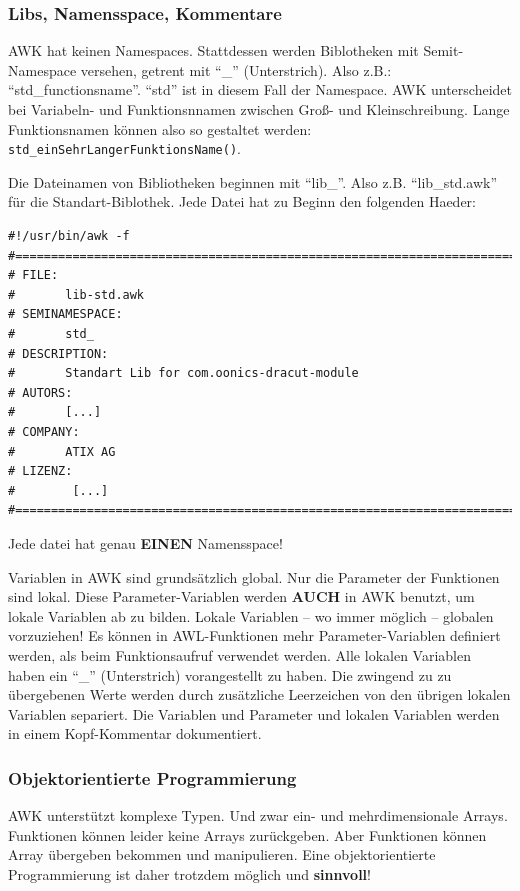 \documentclass[10pt,a4paper]{article}
\begin{document}
\subsubsection{Libs, Namensspace, Kommentare}

AWK hat keinen Namespaces. Stattdessen werden Biblotheken mit Semit-Namespace versehen, getrent mit "`\_"' (Unterstrich). Also z.B.: "`std\_functionsname"'. "`std"' ist in diesem Fall der Namespace. AWK unterscheidet bei Variabeln- und Funktionsnnamen zwischen Groß- und Kleinschreibung. Lange Funktionsnamen können also so gestaltet werden: \texttt{std\_einSehrLangerFunktionsName()}.


Die Dateinamen von Bibliotheken beginnen mit "`lib\_"'. Also z.B. "`lib\_std.awk"' für die Standart-Biblothek. Jede Datei hat zu Beginn den folgenden Haeder:

\begin{lstlisting}
#!/usr/bin/awk -f
#==============================================================================
# FILE:
#       lib-std.awk
# SEMINAMESPACE:
#       std_
# DESCRIPTION:
#       Standart Lib for com.oonics-dracut-module
# AUTORS:
#       [...]
# COMPANY:
#       ATIX AG
# LIZENZ:
#        [...]
#==============================================================================
\end{lstlisting}
Jede datei hat genau \textbf{EINEN} Namensspace!


\bigskip 


Variablen in AWK sind grundsätzlich global. Nur die Parameter der Funktionen sind lokal. Diese Parameter-Variablen werden \textbf{AUCH} in AWK benutzt, um lokale Variablen ab zu bilden. Lokale Variablen -- wo immer möglich -- globalen vorzuziehen! Es können in AWL-Funktionen mehr Parameter-Variablen definiert werden, als beim Funktionsaufruf verwendet werden. Alle lokalen Variablen haben ein  "`\_"' (Unterstrich) vorangestellt zu haben. Die zwingend zu zu übergebenen Werte werden durch zusätzliche Leerzeichen von den übrigen lokalen Variablen separiert. Die Variablen und Parameter und lokalen Variablen werden in einem Kopf-Kommentar dokumentiert.

\bigskip 

\subsubsection{Objektorientierte Programmierung}

AWK unterstützt komplexe Typen. Und zwar ein- und mehrdimensionale Arrays.
Funktionen können leider keine Arrays zurückgeben. Aber Funktionen können Array
übergeben bekommen und manipulieren. Eine objektorientierte
Programmierung ist daher trotzdem möglich und \textbf{sinnvoll}!
\end{document}
